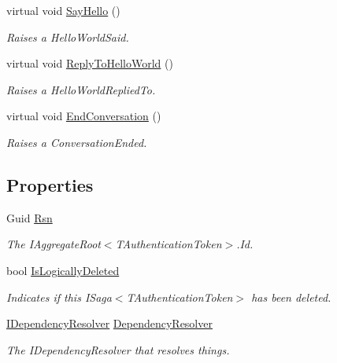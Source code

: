 \begin{DoxyCompactItemize}
virtual void \hyperlink{classCqrs_1_1Akka_1_1Tests_1_1Unit_1_1Aggregates_1_1HelloWorld_a2c5e579e741dc3471e3532f5be3b98ab_a2c5e579e741dc3471e3532f5be3b98ab}{Say\+Hello} ()
\begin{DoxyCompactList}\small\item\em Raises a Hello\+World\+Said. \end{DoxyCompactList}\item 
virtual void \hyperlink{classCqrs_1_1Akka_1_1Tests_1_1Unit_1_1Aggregates_1_1HelloWorld_a6b3c07d040e703d89c7a065064776623_a6b3c07d040e703d89c7a065064776623}{Reply\+To\+Hello\+World} ()
\begin{DoxyCompactList}\small\item\em Raises a Hello\+World\+Replied\+To. \end{DoxyCompactList}\item 
virtual void \hyperlink{classCqrs_1_1Akka_1_1Tests_1_1Unit_1_1Aggregates_1_1HelloWorld_aeeb20725d192b64adf47281d37dd198d_aeeb20725d192b64adf47281d37dd198d}{End\+Conversation} ()
\begin{DoxyCompactList}\small\item\em Raises a Conversation\+Ended. \end{DoxyCompactList}\end{DoxyCompactItemize}
\subsection*{Properties}
\begin{DoxyCompactItemize}
\item 
Guid \hyperlink{classCqrs_1_1Akka_1_1Tests_1_1Unit_1_1Aggregates_1_1HelloWorld_a2e74fa47e00d67d6de3df5b1b8e140f6_a2e74fa47e00d67d6de3df5b1b8e140f6}{Rsn}
\begin{DoxyCompactList}\small\item\em The I\+Aggregate\+Root$<$\+T\+Authentication\+Token$>$.\+Id. \end{DoxyCompactList}\item 
bool \hyperlink{classCqrs_1_1Akka_1_1Tests_1_1Unit_1_1Aggregates_1_1HelloWorld_acd17d8097c0cb44400e876a53b4fbd57_acd17d8097c0cb44400e876a53b4fbd57}{Is\+Logically\+Deleted}
\begin{DoxyCompactList}\small\item\em Indicates if this I\+Saga$<$\+T\+Authentication\+Token$>$ has been deleted. \end{DoxyCompactList}\item 
\hyperlink{interfaceCqrs_1_1Configuration_1_1IDependencyResolver}{I\+Dependency\+Resolver} \hyperlink{classCqrs_1_1Akka_1_1Tests_1_1Unit_1_1Aggregates_1_1HelloWorld_abf66c1d14c78b9ed3ca54225d04a8beb_abf66c1d14c78b9ed3ca54225d04a8beb}{Dependency\+Resolver}
\begin{DoxyCompactList}\small\item\em The I\+Dependency\+Resolver that resolves things. \end{DoxyCompactList}\end{DoxyCompactItemize}
